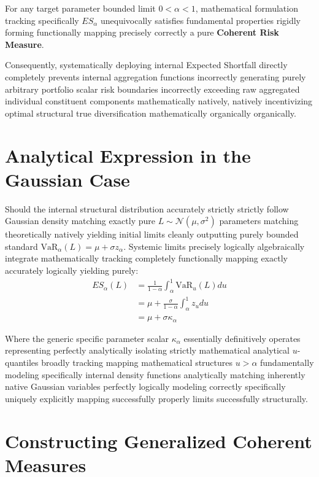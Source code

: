 \begin{theorem}
For any target parameter bounded limit $0 < \alpha < 1$, mathematical formulation tracking specifically $ES_\alpha$ unequivocally satisfies fundamental properties rigidly forming functionally mapping precisely correctly a pure \textbf{Coherent Risk Measure}.
\end{theorem}

Consequently, systematically deploying internal Expected Shortfall directly completely prevents internal aggregation functions incorrectly generating purely arbitrary portfolio scalar risk boundaries incorrectly exceeding raw aggregated individual constituent components mathematically natively, natively incentivizing optimal structural true diversification mathematically organically organically.

\section{Analytical Expression in the Gaussian Case}

Should the internal structural distribution accurately strictly strictly follow Gaussian density matching exactly pure $L \sim \mathcal{N}(\mu, \sigma^2)$ parameters matching theoretically natively yielding initial limits cleanly outputting purely bounded standard $\text{VaR}_\alpha(L) = \mu + \sigma z_\alpha$. Systemic limits precisely logically algebraically integrate mathematically tracking completely functionally mapping exactly accurately logically yielding purely:
\begin{align*}
    ES_\alpha(L) &= \frac{1}{1 - \alpha} \int_{\alpha}^1 \text{VaR}_u(L) du \\
    &= \mu + \frac{\sigma}{1 - \alpha} \int_{\alpha}^1 z_u du \\
    &= \mu + \sigma \kappa_\alpha
\end{align*}

Where the generic specific parameter scalar $\kappa_\alpha$ essentially definitively operates representing perfectly analytically isolating strictly mathematical analytical $u$-quantiles broadly tracking mapping mathematical structures $u > \alpha$ fundamentally modeling specifically internal density functions analytically matching inherently native Gaussian variables perfectly logically modeling correctly specifically uniquely explicitly mapping successfully properly limits successfully structurally.

\section{Constructing Generalized Coherent Measures}

